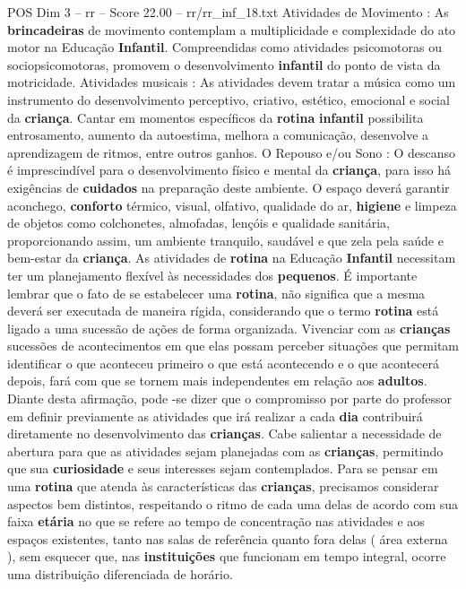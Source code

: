 \begin{textsample}{POS Dim 3 – rr – Score 22.00 – rr/rr\_inf\_18.txt}
Atividades de Movimento : As \textbf{brincadeiras} de movimento contemplam a multiplicidade e complexidade do ato motor na Educação \textbf{Infantil}.
Compreendidas como atividades psicomotoras ou sociopsicomotoras, promovem o desenvolvimento \textbf{infantil} do ponto de vista da motricidade.
Atividades musicais : As atividades devem tratar a música como um instrumento do desenvolvimento perceptivo, criativo, estético, emocional e social da \textbf{criança}.
Cantar em momentos específicos da \textbf{rotina} \textbf{infantil} possibilita entrosamento, aumento da autoestima, melhora a comunicação, desenvolve a aprendizagem de ritmos, entre outros ganhos.
O Repouso e/ou Sono : O descanso é imprescindível para o desenvolvimento físico e mental da \textbf{criança}, para isso há exigências de \textbf{cuidados} na preparação deste ambiente.
O espaço deverá garantir aconchego, \textbf{conforto} térmico, visual, olfativo, qualidade do ar, \textbf{higiene} e limpeza de objetos como colchonetes, almofadas, lençóis e qualidade sanitária, proporcionando assim, um ambiente tranquilo, saudável e que zela pela saúde e bem-estar da \textbf{criança}.
As atividades de \textbf{rotina} na Educação \textbf{Infantil} necessitam ter um planejamento flexível às necessidades dos \textbf{pequenos}.
É importante lembrar que o fato de se estabelecer uma \textbf{rotina}, não significa que a mesma deverá ser executada de maneira rígida, considerando que o termo \textbf{rotina} está ligado a uma sucessão de ações de forma organizada.
Vivenciar com as \textbf{crianças} sucessões de acontecimentos em que elas possam perceber situações que permitam identificar o que aconteceu primeiro o que está acontecendo e o que acontecerá depois, fará com que se tornem mais independentes em relação aos \textbf{adultos}.
Diante desta afirmação, pode -se dizer que o compromisso por parte do professor em definir previamente as atividades que irá realizar a cada \textbf{dia} contribuirá diretamente no desenvolvimento das \textbf{crianças}.
Cabe salientar a necessidade de abertura para que as atividades sejam planejadas com as \textbf{crianças}, permitindo que sua \textbf{curiosidade} e seus interesses sejam contemplados.
Para se pensar em uma \textbf{rotina} que atenda às características das \textbf{crianças}, precisamos considerar aspectos bem distintos, respeitando o ritmo de cada uma delas de acordo com sua faixa \textbf{etária} no que se refere ao tempo de concentração nas atividades e aos espaços existentes, tanto nas salas de referência quanto fora delas ( área externa ), sem esquecer que, nas \textbf{instituições} que funcionam em tempo integral, ocorre uma distribuição diferenciada de horário.

\end{textsample}
